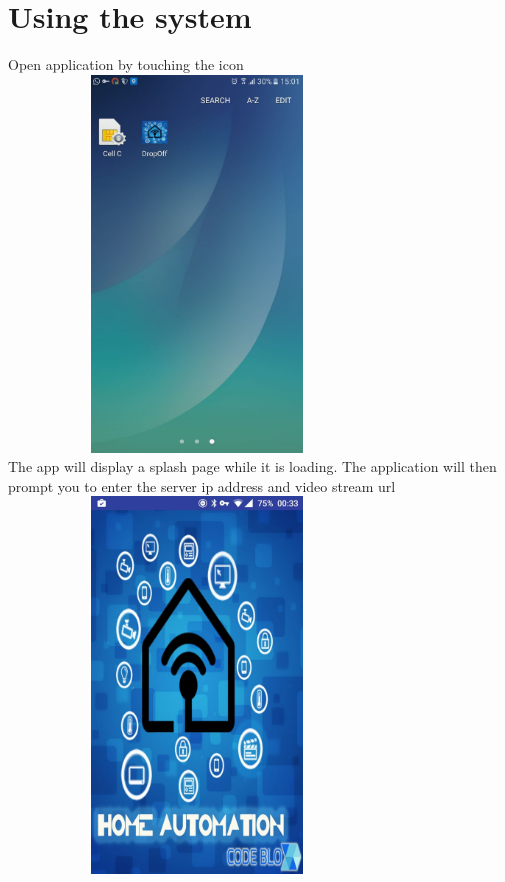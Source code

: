 \documentclass[a4paper,12pt]{article}
\begin{document}
	 \section{Using the system}
	 Open application by touching the icon \newline\newline
	 	\includegraphics[width=10cm,height=10cm,keepaspectratio]{./Pictures/app0.jpeg}\\ \newline
	 The app will display a splash page while it is loading. The application will then prompt you to enter the server ip address and video stream url\newline\newline
	 \includegraphics[width=10cm,height=10cm,keepaspectratio]{./Pictures/app01.jpeg}
\end{document}
